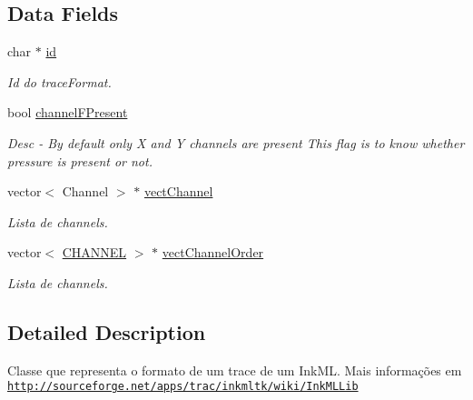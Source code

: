 \subsection*{Data Fields}
\begin{DoxyCompactItemize}
\item 
char $\ast$ \hyperlink{classbr_1_1ufscar_1_1lince_1_1mmi_1_1ink_1_1TraceFormat_ad89fcbbb40fb5691df020fa57b325f44}{id}
\begin{DoxyCompactList}\small\item\em Id do traceFormat. \item\end{DoxyCompactList}\item 
bool \hyperlink{classbr_1_1ufscar_1_1lince_1_1mmi_1_1ink_1_1TraceFormat_ab503ce06d24067ab5f7611793116160e}{channelFPresent}
\begin{DoxyCompactList}\small\item\em Desc -\/ By default only X and Y channels are present This flag is to know whether pressure is present or not. \item\end{DoxyCompactList}\item 
vector$<$ Channel $>$ $\ast$ \hyperlink{classbr_1_1ufscar_1_1lince_1_1mmi_1_1ink_1_1TraceFormat_a7a441396c4a7f0d3a0d05bff74495f37}{vectChannel}
\begin{DoxyCompactList}\small\item\em Lista de channels. \item\end{DoxyCompactList}\item 
vector$<$ \hyperlink{namespacebr_1_1ufscar_1_1lince_1_1mmi_1_1ink_a857f7b80c5d28f256c70d78cacf91dab}{CHANNEL} $>$ $\ast$ \hyperlink{classbr_1_1ufscar_1_1lince_1_1mmi_1_1ink_1_1TraceFormat_ab69e1f7711dde259cb5ef481d025f556}{vectChannelOrder}
\begin{DoxyCompactList}\small\item\em Lista de channels. \item\end{DoxyCompactList}\end{DoxyCompactItemize}


\subsection{Detailed Description}
Classe que representa o formato de um trace de um InkML. Mais informações em \href{http://sourceforge.net/apps/trac/inkmltk/wiki/InkMLLib}{\tt http://sourceforge.net/apps/trac/inkmltk/wiki/InkMLLib} 

